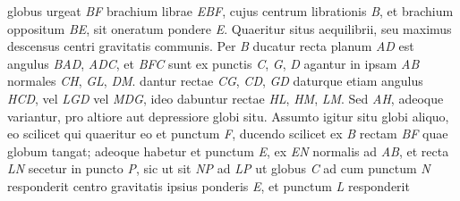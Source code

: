 globus urgeat \textit{BF} brachium librae 
\textit{EBF}, cujus centrum librationis 
\textit{B}, et brachium oppositum \textit{BE}, 
sit oneratum pondere \textit{E}. Quaeritur situs aequilibrii,
seu maximus descensus
centri gravitatis communis. %
\pend
\pstart
Per \textit{B} ducatur recta
planum \textit{AD}
est angulus \textit{BAD}, 
\textit{ADC}, et \textit{BFC} sunt 
ex punctis \textit{C}, \textit{G}, \textit{D} agantur in ipsam \textit{AB} normales \textit{CH}, \textit{GL}, \textit{DM}. 
dantur rectae \textit{CG}, \textit{CD}, \textit{GD} 
daturque etiam angulus \textit{HCD}, vel \textit{LGD} vel \textit{MDG}, 
ideo dabuntur rectae \textit{HL}, \textit{HM}, \textit{LM}. Sed \textit{AH}, adeoque 
variantur, pro altiore aut depressiore globi situ. Assumto igitur situ globi aliquo, eo scilicet qui quaeritur eo
et punctum \textit{F}, ducendo scilicet ex \textit{B} rectam \textit{BF} quae globum tangat; adeoque habetur et punctum \textit{E}, ex
\textit{EN} normalis ad \textit{AB}, et recta \textit{LN} secetur in puncto \textit{P}, sic ut sit \textit{NP} ad \textit{LP} ut globus \textit{C} ad
cum punctum \textit{N} responderit centro gravitatis ipsius ponderis \textit{E}, et punctum \textit{L} responderit
